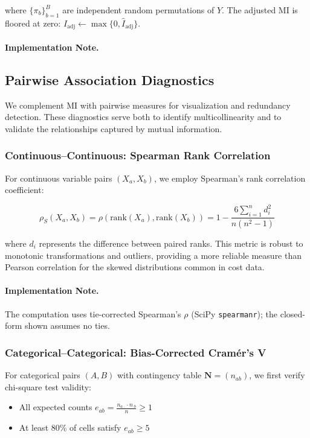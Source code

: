 where $\{\pi_b\}_{b=1}^B$ are independent random permutations of $Y$. The adjusted MI is floored at zero: $\widehat{I}_{\text{adj}} \leftarrow \max\{0, \widehat{I}_{\text{adj}}\}$.

\paragraph{Implementation Note.} \FSNoteMI

\subsection{Pairwise Association Diagnostics}

We complement MI with pairwise measures for visualization and redundancy detection. These diagnostics serve both to identify multicollinearity and to validate the relationships captured by mutual information.

\subsubsection{Continuous--Continuous: Spearman Rank Correlation}

For continuous variable pairs $(X_a, X_b)$, we employ Spearman's rank correlation coefficient:

\begin{equation}
\rho_S(X_a, X_b) = \rho(\text{rank}(X_a), \text{rank}(X_b)) = 1 - \frac{6\sum_{i=1}^{n} d_i^2}{n(n^2-1)}
\label{eq:spearman}
\end{equation}

where $d_i$ represents the difference between paired ranks. This metric is robust to monotonic transformations and outliers, providing a more reliable measure than Pearson correlation for the skewed distributions common in cost data.

\paragraph{Implementation Note.} The computation uses tie-corrected Spearman's $\rho$ (SciPy \texttt{spearmanr}); the closed-form shown assumes no ties.

\subsubsection{Categorical--Categorical: Bias-Corrected Cramér's V}

For categorical pairs $(A, B)$ with contingency table $\mathbf{N} = (n_{ab})$, we first verify chi-square test validity:
\begin{itemize}
    \item All expected counts $e_{ab} = \frac{n_{a\cdot} \cdot n_{\cdot b}}{n} \geq 1$
    \item At least 80\% of cells satisfy $e_{ab} \geq 5$
\end{itemize}

